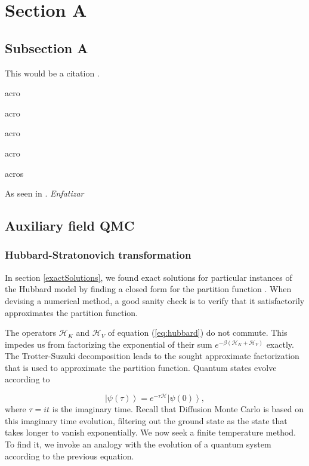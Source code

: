 \section{Section A}
\label{sec:sectiona}

\subsection{Subsection A}
\label{subsec:subasectionA}

This would be a citation \cite{dummy}.

\ac{acro} 

\acf{acro}

\acs{acro}

\acl{acro}

\acp{acro}

As seen in \cite{wiki}. \emph{Enfatizar}

\subsection{Auxiliary field QMC}
\label{subsec:afqmc}

\subsubsection{Hubbard-Stratonovich transformation}

In section \ref{exactSolutions}, we found exact solutions for particular instances of the Hubbard model by finding a closed form for the partition function \cite{Bai2006}. When devising a numerical method, a good sanity check is to verify that it satisfactorily approximates the partition function.

The operators $\mathcal{H}_K$ and $\mathcal{H}_V$ of equation (\ref{eq:hubbard}) do not commute. This impedes us from factorizing the exponential of their sum $e^{-\beta (\mathcal{H}_K + \mathcal{H}_V)}$ exactly. The Trotter-Suzuki decomposition leads to the sought approximate factorization that is used to approximate the partition function. Quantum states evolve according to

\begin{equation}
\left| \psi (\tau) \right\rangle = e^{-\tau \mathcal{H} } \left| \psi (0) \right\rangle ,
\end{equation}
where $\tau = it$ is the imaginary time. Recall that Diffusion Monte Carlo is based on this imaginary time evolution, filtering out the ground state as the state that takes longer to vanish exponentially. We now seek a finite temperature method. To find it, we invoke an analogy with the evolution of a quantum system according to the previous equation.

